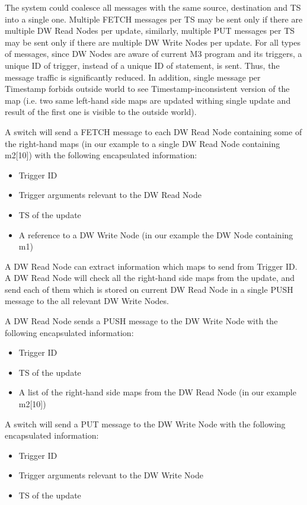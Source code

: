 \documentclass{sig-semester}
\def\M3{M3\xspace}
\begin{document}
The system could coalesce all messages with the same source, destination and TS into a single one. Multiple FETCH messages per TS may be sent only if there are multiple DW Read Nodes per update, similarly, multiple PUT messages per TS may be sent only if there are multiple DW Write Nodes per update. For all types of messages, since DW Nodes are aware of current \M3 program and its triggers, a unique ID of trigger, instead of a unique ID of statement, is sent. Thus, the message traffic is significantly reduced. In addition, single message per Timestamp forbids outside world to see Timestamp-inconsistent version of the map (i.e. two same left-hand side maps are updated withing single update and result of the first one is visible to the outside world).

A switch will send a FETCH message to each DW Read Node containing some of the right-hand maps (in our example to a single DW Read Node containing m2[10]) with the following encapsulated information:
\begin{itemize}
 \item Trigger ID
 \item Trigger arguments relevant to the DW Read Node
 \item TS of the update
 \item A reference to a DW Write Node (in our example the DW Node containing m1)
\end{itemize}

A DW Read Node can extract information which maps to send from Trigger ID. A DW Read Node will check all the right-hand side maps from the update, and send each of them which is stored on current DW Read Node in a single PUSH message to the all relevant DW Write Nodes.

A DW Read Node sends a PUSH message to the DW Write Node with the following encapsulated information:
\begin{itemize}
 \item Trigger ID
 \item TS of the update
 \item A list of the right-hand side maps from the DW Read Node (in our example m2[10])
\end{itemize}

A switch will send a PUT message to the DW Write Node with the following encapsulated information:
\begin{itemize}
 \item Trigger ID
 \item Trigger arguments relevant to the DW Write Node
 \item TS of the update
\end{itemize}
\end{document}
